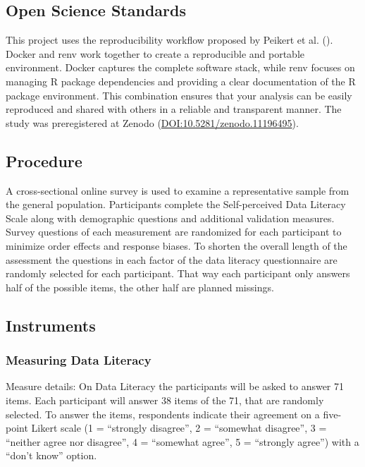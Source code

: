 \documentclass[
  12pt,
  a4paper,
  twoside]{article}
\begin{document}
\subsection{Open Science Standards}\label{open-science-standards}

This project uses the reproducibility workflow proposed by Peikert et al. (). Docker and renv work together to create a reproducible and portable
environment. Docker captures the complete software stack, while renv focuses on
managing R package dependencies and providing a clear documentation of the R
package environment. This combination ensures that your analysis can be easily
reproduced and shared with others in a reliable and transparent manner.
The study was preregistered at Zenodo (\url{DOI:10.5281/zenodo.11196495}).

\subsection{Procedure}\label{procedure}

A cross-sectional online survey is used to examine a representative sample from the general population. Participants complete the Self-perceived Data Literacy Scale along with demographic questions and additional validation measures. Survey questions of each measurement are randomized for each participant to minimize order effects and response biases. To shorten the overall length of the assessment the questions in each factor of the data literacy questionnaire are randomly selected for each participant. That way each participant only answers half of the possible items, the other half are planned missings.

\subsection{Instruments}\label{instruments}

\subsubsection{Measuring Data Literacy}\label{measuring-data-literacy}

Measure details: On Data Literacy the participants will be asked to answer 71
items. Each participant will answer 38 items of the 71, that are randomly selected.
To answer the items, respondents indicate their agreement on a five-point Likert
scale (1 = ``strongly disagree'', 2 = ``somewhat disagree'', 3 = ``neither agree nor
disagree'', 4 = ``somewhat agree'', 5 = ``strongly agree'') with a ``don't know''
option.
\end{document}
